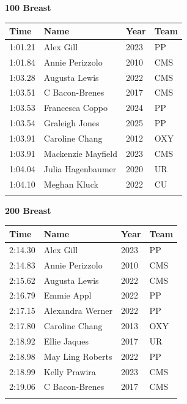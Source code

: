 \vspace{1.2em}
\noindent\begin{minipage}[t]{0.98\textwidth}
\centering
\textbf{\textcolor{teamprimary}{100 Breast}}\par
\vspace{0.5em}
\centering
\small
\renewcommand{\arraystretch}{1.0}
\setlength{\tabcolsep}{4pt}
\begin{tabular}{@{}p{2.5cm}p{4.5cm}p{1.5cm}p{2.5cm}@{}}
\toprule
\textbf{Time} & \textbf{Name} & \textbf{Year} & \textbf{Team} \\
\midrule
1:01.21 & Alex Gill & 2023 & PP \\
1:01.84 & Annie Perizzolo & 2010 & CMS \\
1:03.28 & Augusta Lewis & 2022 & CMS \\
1:03.51 & C Bacon-Brenes & 2017 & CMS \\
1:03.53 & Francesca Coppo & 2024 & PP \\
1:03.54 & Graleigh Jones & 2025 & PP \\
1:03.91 & Caroline Chang & 2012 & OXY \\
1:03.91 & Mackenzie Mayfield & 2023 & CMS \\
1:04.04 & Julia Hagenbaumer & 2020 & UR \\
1:04.10 & Meghan Kluck & 2022 & CU \\
\bottomrule
\vspace{0.5em}
\end{tabular}
\end{minipage}
\vspace{1.2em}
\noindent\begin{minipage}[t]{0.98\textwidth}
\centering
\textbf{\textcolor{teamprimary}{200 Breast}}\par
\vspace{0.5em}
\centering
\small
\renewcommand{\arraystretch}{1.0}
\setlength{\tabcolsep}{4pt}
\begin{tabular}{@{}p{2.5cm}p{4.5cm}p{1.5cm}p{2.5cm}@{}}
\toprule
\textbf{Time} & \textbf{Name} & \textbf{Year} & \textbf{Team} \\
\midrule
2:14.30 & Alex Gill & 2023 & PP \\
2:14.83 & Annie Perizzolo & 2010 & CMS \\
2:15.62 & Augusta Lewis & 2022 & CMS \\
2:16.79 & Emmie Appl & 2022 & PP \\
2:17.15 & Alexandra Werner & 2022 & PP \\
2:17.80 & Caroline Chang & 2013 & OXY \\
2:18.92 & Ellie Jaques & 2017 & UR \\
2:18.98 & May Ling Roberts & 2022 & PP \\
2:18.99 & Kelly Prawira & 2023 & CMS \\
2:19.06 & C Bacon-Brenes & 2017 & CMS \\
\bottomrule
\vspace{0.5em}
\end{tabular}
\end{minipage}
